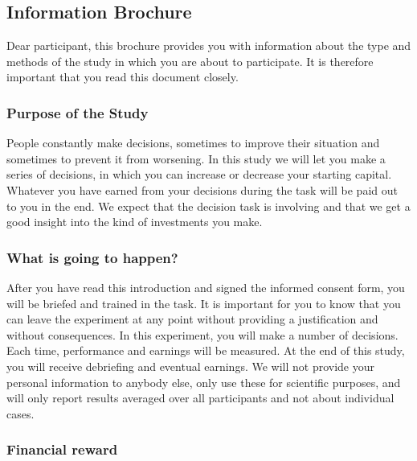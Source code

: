 \documentclass[man]{apa6}
\begin{document}
\hypertarget{information-brochure}{%
\subsection{Information Brochure}\label{information-brochure}}

Dear participant, this brochure provides you with information about the
type and methods of the study in which you are about to participate. It
is therefore important that you read this document closely.

\hypertarget{purpose-of-the-study}{%
\subsubsection{Purpose of the Study}\label{purpose-of-the-study}}

People constantly make decisions, sometimes to improve their situation
and sometimes to prevent it from worsening. In this study we will let
you make a series of decisions, in which you can increase or decrease
your starting capital. Whatever you have earned from your decisions
during the task will be paid out to you in the end. We expect that the
decision task is involving and that we get a good insight into the kind
of investments you make.

\hypertarget{what-is-going-to-happen}{%
\subsubsection{What is going to happen?}\label{what-is-going-to-happen}}

After you have read this introduction and signed the informed consent
form, you will be briefed and trained in the task. It is important for
you to know that you can leave the experiment at any point without
providing a justification and without consequences. In this experiment,
you will make a number of decisions. Each time, performance and earnings
will be measured. At the end of this study, you will receive debriefing
and eventual earnings. We will not provide your personal information to
anybody else, only use these for scientific purposes, and will only
report results averaged over all participants and not about individual
cases.

\hypertarget{financial-reward}{%
\subsubsection{Financial reward}\label{financial-reward}}
\end{document}
